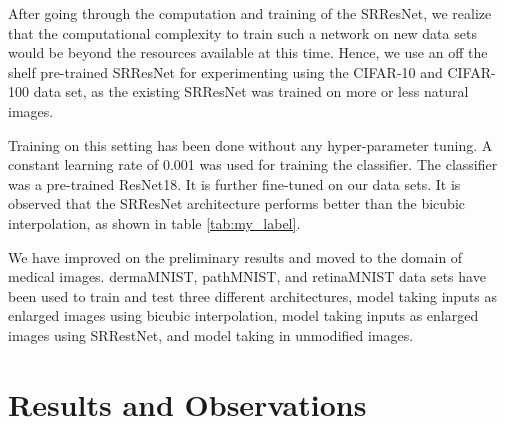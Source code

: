 \documentclass[10pt,twocolumn,letterpaper]{article}
\begin{document}
After going through the computation and training of the SRResNet, we realize that the computational complexity to train such a network on new data sets would be beyond the resources available at this time. Hence, we use an off the shelf pre-trained SRResNet for experimenting using the CIFAR-10 and CIFAR-100 data set, as the existing SRResNet was trained on more or less natural images.

Training on this setting has been done without any hyper-parameter tuning. A constant learning rate of 0.001 was used for training the classifier. The classifier was a pre-trained ResNet18. It is further fine-tuned on our data sets. It is observed that the SRResNet architecture performs better than the bicubic interpolation, as shown in table \ref{tab:my_label}.

We have improved on the preliminary results and moved to the domain of medical images. dermaMNIST, pathMNIST, and retinaMNIST data sets have been used to train and test three different architectures, model taking inputs as enlarged images using bicubic interpolation, model taking inputs as enlarged images using SRRestNet, and model taking in unmodified images.

\section{Results and Observations}
\end{document}
